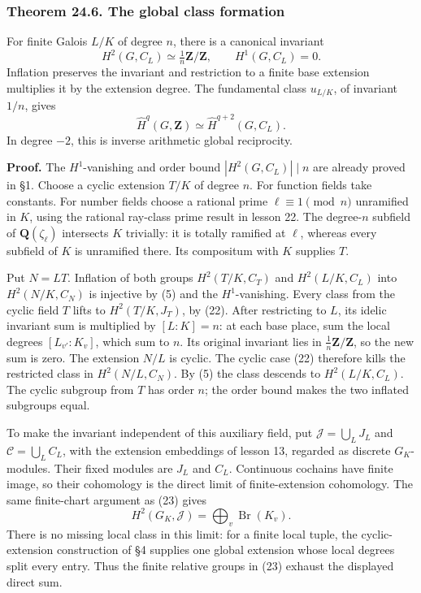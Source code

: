 \documentclass[11pt,a4paper]{article}
\begin{document}
\subsubsection{Theorem 24.6. The global class
formation}\label{theorem-24.6.-the-global-class-formation}

For finite Galois \(L/K\) of degree \(n\), there is a canonical
invariant \[
H^2(G,C_L)\simeq\tfrac1n\mathbf Z/\mathbf Z,
\qquad H^1(G,C_L)=0.
\tag{25}
\] Inflation preserves the invariant and restriction to a finite base
extension multiplies it by the extension degree. The fundamental class
\(u_{L/K}\), of invariant \(1/n\), gives \[
\widehat H^q(G,\mathbf Z)\simeq\widehat H^{q+2}(G,C_L).
\tag{26}
\] In degree \(-2\), this is inverse arithmetic global reciprocity.

\textbf{Proof.} The \(H^1\)-vanishing and order bound
\(|H^2(G,C_L)|\mid n\) are already proved in §1. Choose a cyclic
extension \(T/K\) of degree \(n\). For function fields take constants.
For number fields choose a rational prime \(\ell\equiv1\pmod n\)
unramified in \(K\), using the rational ray-class prime result in lesson
22. The degree-\(n\) subfield of \(\mathbf Q(\zeta_\ell)\) intersects
\(K\) trivially: it is totally ramified at \(\ell\), whereas every
subfield of \(K\) is unramified there. Its compositum with \(K\)
supplies \(T\).

Put \(N=LT\). Inflation of both groups \(H^2(T/K,C_T)\) and
\(H^2(L/K,C_L)\) into \(H^2(N/K,C_N)\) is injective by (5) and the
\(H^1\)-vanishing. Every class from the cyclic field \(T\) lifts to
\(H^2(T/K,J_T)\), by (22). After restricting to \(L\), its idelic
invariant sum is multiplied by \([L:K]=n\): at each base place, sum the
local degrees \([L_{v'}:K_v]\), which sum to \(n\). Its original
invariant lies in \(\tfrac1n\mathbf Z/\mathbf Z\), so the new sum is
zero. The extension \(N/L\) is cyclic. The cyclic case (22) therefore
kills the restricted class in \(H^2(N/L,C_N)\). By (5) the class
descends to \(H^2(L/K,C_L)\). The cyclic subgroup from \(T\) has order
\(n\); the order bound makes the two inflated subgroups equal.

To make the invariant independent of this auxiliary field, put
\(\mathcal J=\bigcup_L J_L\) and \(\mathcal C=\bigcup_L C_L\), with the
extension embeddings of lesson 13, regarded as discrete \(G_K\)-modules.
Their fixed modules are \(J_L\) and \(C_L\). Continuous cochains have
finite image, so their cohomology is the direct limit of
finite-extension cohomology. The same finite-chart argument as (23)
gives \[
H^2(G_K,\mathcal J)=\bigoplus_v\operatorname{Br}(K_v).
\tag{27}
\] There is no missing local class in this limit: for a finite local
tuple, the cyclic-extension construction of §4 supplies one global
extension whose local degrees split every entry. Thus the finite
relative groups in (23) exhaust the displayed direct sum.
\end{document}
